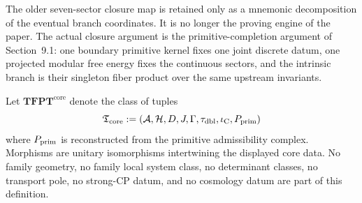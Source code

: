 \begin{remark}
The older seven-sector closure map is retained only as a mnemonic decomposition of the eventual
branch coordinates. It is no longer the proving engine of the paper. The actual closure argument is
the primitive-completion argument of Section~9.1: one boundary primitive kernel fixes one joint
discrete datum, one projected modular free energy fixes the continuous sectors, and the intrinsic
branch is their singleton fiber product over the same upstream invariants.
\end{remark}

\begin{definition}
\label{def:tfpt-core-class}
Let $\mathbf{TFPT}^{\mathrm{core}}$ denote the class of tuples
\[
\mathfrak T_{\mathrm{core}}:=(\mathcal A,\mathcal H,D,J,\Gamma,\tau_{\mathrm{dbl}},\iota_{\mathrm C},P_{\mathrm{prim}})
\]
where $P_{\mathrm{prim}}$ is reconstructed from the primitive admissibility complex. Morphisms are unitary
isomorphisms intertwining the displayed core data. No family geometry, no family local system
class, no determinant classes, no transport pole, no strong-CP datum, and no cosmology datum are
part of this definition.
\end{definition}

